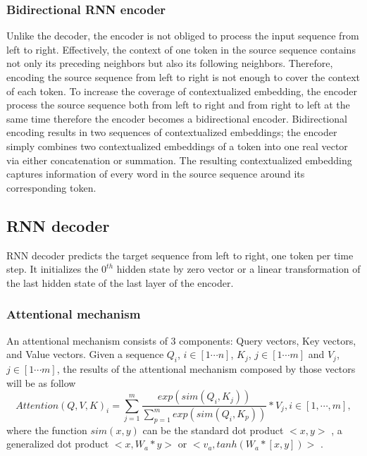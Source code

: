 \subsubsection{Bidirectional RNN encoder}
Unlike the decoder, the encoder is not obliged to process the input sequence from left to right. Effectively, the context of one token in the source sequence contains not only its preceding neighbors but also its following neighbors. Therefore, encoding the source sequence from left to right is not enough to cover the context of each token. To increase the coverage of contextualized embedding, the encoder process the source sequence both from left to right and from right to left at the same time therefore the encoder becomes a bidirectional encoder. Bidirectional encoding results in two sequences of contextualized embeddings; the encoder simply combines two contextualized embeddings of a token into one real vector via either concatenation or summation. The resulting contextualized embedding captures information of every word in the source sequence around its corresponding token. 
\subsection{RNN decoder}
RNN decoder predicts the target sequence from left to right, one token per time step. It initializes the $0^{th}$ hidden state by zero vector or a linear transformation of the last hidden state of the last layer of the encoder. 
\subsubsection{Attentional mechanism \label{ssec:attention}}
An attentional mechanism consists of 3 components: Query vectors, Key vectors, and Value vectors. Given a sequence $Q_i$, $i \in [1 \cdots n]$, $K_j$, $j \in [1 \cdots m]$ and $V_j$, $j \in [1 \cdots m]$, the results
of the attentional mechanism composed by those vectors will be as follow
\begin{equation}
Attention(Q,V,K)_i = \displaystyle{\mathop{\sum}_{j=1}^{m}} \frac{exp(sim(Q_i,K_j))}{\displaystyle{\mathop{\sum}_{p=1}^{m}}exp(sim(Q_i,K_p))}*V_j, i \in [1, \cdots, m],
\end{equation}
where the function $sim(x,y)$ can be the standard dot product $<x,y>$ \citep{Vaswani17attention}, a generalized dot product $<x,W_a*y>$ or $<v_a, tanh(W_a*[x,y])>$ \citep{Luong15stanford, Bahdanau15learning}.


